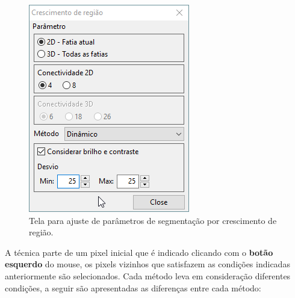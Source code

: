 \begin{figure}[!htb]
\centering
\includegraphics[scale=0.7]{../user_guide_figures/invesalius_screen/segmentation_region_growing_dinamic_pt.png}
\caption{Tela para ajuste de parâmetros de segmentação por crescimento de região.}
\label{fig:segmentation_region_growing_dinamic}
\end{figure}

A técnica parte de um pixel inicial que é indicado clicando com o \textbf{botão esquerdo} do mouse, os pixels vizinhos que satisfazem as condições indicadas anteriormente são selecionados. Cada método leva em consideração diferentes condições, a seguir são apresentadas as diferenças entre cada método:


